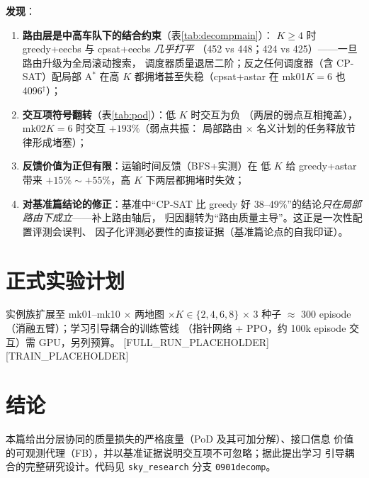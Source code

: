 \documentclass[UTF8,12pt,a4paper]{ctexart}
\begin{document}
\textbf{发现}：
\begin{enumerate}
  \item \textbf{路由层是中高车队下的结合约束}（表\ref{tab:decompmain}）：
    $K\ge4$ 时 greedy+eecbs 与 cpsat+eecbs \emph{几乎打平}
    （452 vs 448；424 vs 425）——一旦路由升级为全局滚动搜索，
    调度器质量退居二阶；反之任何调度器（含 CP-SAT）配局部 A$^*$
    在高 $K$ 都拥堵甚至失稳（cpsat+astar 在 mk01$K{=}6$ 也 4096$^\dagger$）；
  \item \textbf{交互项符号翻转}（表\ref{tab:pod}）：低 $K$ 时交互为负
    （两层的弱点互相掩盖），mk02$K{=}6$ 时交互 $+193\%$（弱点共振：
    局部路由 $\times$ 名义计划的任务释放节律形成堵塞）；
  \item \textbf{反馈价值为正但有限}：运输时间反馈（BFS+实测）在
    低 $K$ 给 greedy+astar 带来 $+15\%\sim+55\%$，高 $K$ 下两层都拥堵时失效；
  \item \textbf{对基准篇结论的修正}：基准中``CP-SAT 比 greedy 好
    38--49\%''的结论\emph{只在局部路由下成立}——补上路由轴后，
    归因翻转为``路由质量主导''。这正是一次性配置评测会误判、
    因子化评测必要性的直接证据（基准篇论点的自我印证）。
\end{enumerate}

\section{正式实验计划}

实例族扩展至 mk01--mk10 $\times$ 两地图 $\times K\in\{2,4,6,8\}$ $\times$
3 种子 $\approx$ 300 episode（消融五臂）；学习引导耦合的训练管线
（指针网络 + PPO，约 100k episode 交互）需 GPU，另列预算。
[FULL\_RUN\_PLACEHOLDER] [TRAIN\_PLACEHOLDER]

\section{结论}

本篇给出分层协同的质量损失的严格度量（PoD 及其可加分解）、接口信息
价值的可观测代理（FB），并以基准证据说明交互项不可忽略；据此提出学习
引导耦合的完整研究设计。代码见 \texttt{sky\_research} 分支
\texttt{0901decomp}。



\end{document}
